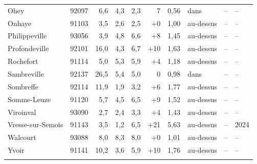 \begin{longtable}{lrrrrrrlll}
Ohey & 92097 & 6{,}6 & 4{,}3 & 2{,}3 & \textminus{}7 & 0{,}56 & dans & -- & -- \\
Onhaye & 91103 & 3{,}5 & 2{,}6 & 2{,}5 & +0 & 1{,}00 & au-dessus & -- & -- \\
Philippeville & 93056 & 3{,}9 & 4{,}8 & 6{,}6 & +8 & 1{,}45 & au-dessus & -- & -- \\
Profondeville & 92101 & 16{,}0 & 4{,}3 & 6{,}7 & +10 & 1{,}63 & au-dessus & -- & -- \\
Rochefort & 91114 & 5{,}0 & 5{,}3 & 5{,}9 & +4 & 1{,}18 & au-dessus & -- & -- \\
Sambreville & 92137 & 26{,}5 & 5{,}4 & 5{,}0 & \textminus{}0 & 0{,}98 & dans & -- & -- \\
Sombreffe & 92114 & 11{,}9 & 1{,}9 & 3{,}2 & +6 & 1{,}77 & au-dessus & -- & -- \\
Somme-Leuze & 91120 & 5{,}7 & 4{,}5 & 6{,}5 & +9 & 1{,}52 & au-dessus & -- & -- \\
Viroinval & 93090 & 2{,}7 & 2{,}4 & 3{,}3 & +4 & 1{,}43 & au-dessus & -- & -- \\
Vresse-sur-Semois & 91143 & 3{,}5 & 1{,}2 & 6{,}5 & +21 & 5{,}63 & au-dessus & -- & 2024 \\
Walcourt & 93088 & 8{,}0 & 8{,}3 & 8{,}0 & +0 & 1{,}01 & au-dessus & -- & -- \\
Yvoir & 91141 & 10{,}2 & 3{,}6 & 5{,}9 & +10 & 1{,}76 & au-dessus & -- & -- \\
\addlinespace
\end{longtable}
